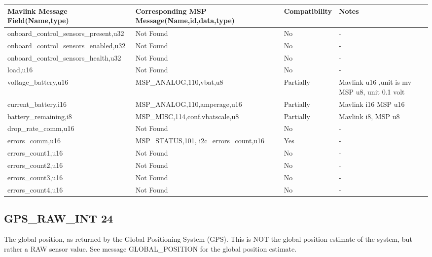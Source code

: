 {
\centering
\begin{tabular}{ |p{5cm} |p{7cm} | p{2cm}|m{5em}|}
\hline
Mavlink Message Field(Name,type)&Corresponding MSP Message(Name,id,data,type)& Compatibility & Notes\\
\hline
onboard\_control\_sensors\_present,u32 & Not Found & No & - \\
\hline
\hline
onboard\_control\_sensors\_enabled,u32 & Not Found & No & - \\
\hline
onboard\_control\_sensors\_health,u32 & Not Found & No & - \\
\hline
load,u16 & Not Found & No & - \\
\hline
\rowcolor{lightgray}
voltage\_battery,u16 & MSP\_ANALOG,110,vbat,u8 & Partially &  Mavlink u16 ,unit is mv MSP u8, unit 0.1 volt  \\
\rowcolor{lightgray}
\hline
current\_battery,i16 &  MSP\_ANALOG,110,amperage,u16 & Partially & Mavlink i16 MSP u16 \\
\hline
\rowcolor{lightgray}
battery\_remaining,i8 & MSP\_MISC,114,conf.vbatscale,u8 & Partially &  Mavlink i8, MSP u8  \\
\hline
drop\_rate\_comm,u16 & Not Found & No & - \\
\hline
\rowcolor{green}
errors\_comm,u16 & MSP\_STATUS,101, i2c\_errors\_count,u16 & Yes &  - \\
\hline
errors\_count1,u16 & Not Found & No & - \\
\hline
errors\_count2,u16 & Not Found & No & - \\
\hline
errors\_count3,u16 & Not Found & No & - \\
\hline
errors\_count4,u16 & Not Found & No & - \\

\end{tabular}
}
\cleardoublepage



\subsection{GPS\_RAW\_INT 24} 
The global position, as returned by the Global Positioning System (GPS). This is NOT the global position estimate of the system, but rather a RAW sensor value. See message GLOBAL\_POSITION for the global position estimate. \\ 

